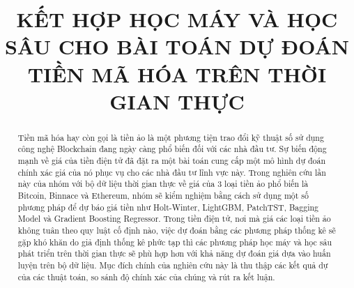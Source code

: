 \documentclass[conference]{IEEEtran}
\begin{document}
\title{KẾT HỢP HỌC MÁY VÀ HỌC SÂU CHO BÀI TOÁN DỰ ĐOÁN TIỀN MÃ HÓA TRÊN THỜI GIAN THỰC\\
}

\author{
\and
{}
\and
{}
\and
\and


}

\maketitle

\begin{abstract}
Tiền mã hóa hay còn gọi là tiền ảo là một phương tiện trao đổi kỹ thuật số sử dụng công nghệ Blockchain đang ngày càng phổ biến đối với các nhà đầu tư. Sự biến động mạnh về giá của tiền điện tử đã đặt ra một bài toán cung cấp một mô hình dự đoán chính xác giá của nó phục vụ cho các nhà đầu tư lĩnh vực này. Trong nghiên cứu lần này của nhóm với bộ dữ liệu thời gian thực về giá của 3 loại tiền ảo phổ biến là Bitcoin, Binnace và Ethereum, nhóm sẽ kiểm nghiệm bằng cách sử dụng một số phương pháp để dự báo giá tiền như Holt-Winter, LightGBM, PatchTST, Bagging Model và Gradient Boosting Regressor. Trong tiền điện tử, nơi mà giá các loại tiền ảo không tuân theo quy luật cố định nào, việc dự đoán bằng các phương pháp thống kê sẽ gặp khó khăn do giả định thống kê phức tạp thì các phương pháp học máy và học sâu phát triển trên thời gian thực sẽ phù hợp hơn với khả năng dự đoán giá dựa vào huấn luyện trên bộ dữ liệu. Mục đích chính của nghiên cứu này là thu thập các kết quả dự của các thuật toán, so sánh độ chính xác của chúng và rút ra kết luận.
\end{abstract}
\end{document}
